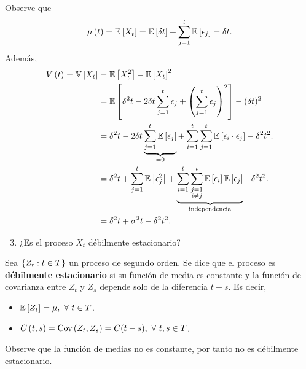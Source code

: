 \documentclass[../main.tex]{subfiles}
\begin{document}
    \begin{demostracion}
    	Observe que
    	\begin{align*}
    		\mu\left( t \right) = \mathbb{E} \left[ X_t \right] = \mathbb{E} \left[ \delta t \right] + \sum_{j = 1}^{t} \mathbb{E} \left[ \epsilon_j \right] = \delta t.
    	\end{align*}
    	Además,
    	\begin{align*}
    		V\left( t \right) = \mathbb{V} \left[ X_t \right] &= \mathbb{E} \left[ X_t^2 \right] - \mathbb{E} \left[ X_t \right]^2\\
    		&= \mathbb{E} \left[ \delta^2 t - 2 \delta t \sum_{j = 1}^{t} \epsilon_j + \left( \sum_{j = 1}^{t} \epsilon_j \right)^2 \right] - (\delta t)^2\\
    		&= \delta^2 t - 2\delta t \underbrace{\sum_{j = 1}^{t} \mathbb{E} \left[ \epsilon_j \right]}_{= 0} + \sum_{i = 1}^{t} \sum_{j = 1}^{t} \mathbb{E} \left[ \epsilon_i \cdot \epsilon_j \right] - \delta^2 t^2.\\
    		&= \delta^2 t + \sum_{j = 1}^{t} \mathbb{E} \left[ \epsilon_j^2 \right] + \underbrace{\sum_{i = 1}^{t} \sum_{\substack{j=1\\i \neq j}}^t \mathbb{E} \left[ \epsilon_i \right]\mathbb{E} \left[ \epsilon_j \right]}_{\text{independencia}} - \delta^2 t^2.\\
    		&= \delta^2 t + \sigma^2 t - \delta^2 t^2.
    	\end{align*}
    \end{demostracion}
    \vspace{1em}
    \begin{enunciado}
    	\begin{enumerate}
            \setcounter{enumi}{2}
    		\item ¿Es el proceso $X_t$ débilmente estacionario?
    	\end{enumerate}
    \end{enunciado}
    \begin{demostracion}
    	\begin{definicion}
            Sea $\left\lbrace Z_t : t \in T \right\rbrace$ un proceso de segundo orden. Se dice que el proceso es \textbf{débilmente estacionario} si su función de media es constante y la función de covarianza entre $Z_t$ y $Z_s$ depende solo de la diferencia $t-s$. Es decir,
                \begin{itemize}
                    \item $\mathbb{E} \left[ Z_t \right] = \mu,\ \forall\  t \in T$.
                    \item $\f C {t,s} = \Cov{Z_t,Z_s} = C(t-s),\ \paratodo t,s \in T$.
                \end{itemize}
    	\end{definicion}
        Observe que la función de medias no es constante, por tanto no es débilmente estacionario.
    \end{demostracion}
\end{document}
